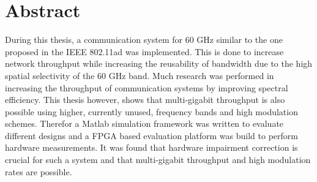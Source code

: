 \chapter*{Abstract}
During this thesis, a communication system for 60 GHz similar to the one proposed
in the \gls{IEEE} 802.11ad was implemented.
This is done to increase network throughput while
increasing the reusability of bandwidth due to the high spatial selectivity
of the 60 GHz band.
Much research was performed in increasing the throughput of communication systems
by improving spectral efficiency.
This thesis however, shows that multi-gigabit throughput is also possible using
higher, currently unused, frequency bands and high modulation schemes.
Therefor a Matlab simulation framework was written to evaluate different designs
and a \acrshort{FPGA} based evaluation platform was build to perform hardware
measurements.
It was found that hardware impairment correction is crucial for such a system
and that multi-gigabit throughput and high modulation
rates are possible.

